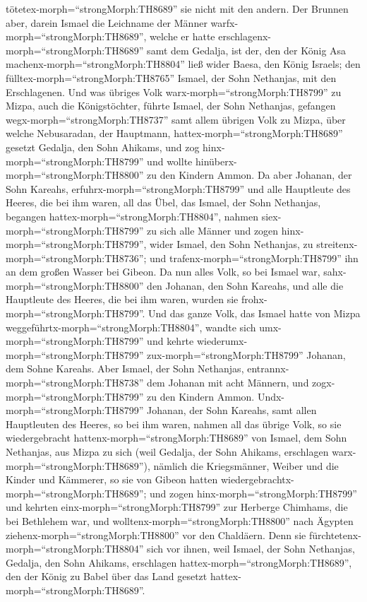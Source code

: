 tötetex-morph=``strongMorph:TH8689'' sie nicht mit den andern.
 Der Brunnen aber, darein Ismael die Leichname der Männer
warfx-morph=``strongMorph:TH8689'', welche er hatte
erschlagenx-morph=``strongMorph:TH8689'' samt dem Gedalja, ist der, den
der König Asa machenx-morph=``strongMorph:TH8804'' ließ wider Baesa, den
König Israels; den fülltex-morph=``strongMorph:TH8765'' Ismael, der Sohn
Nethanjas, mit den Erschlagenen.  Und was übriges Volk
warx-morph=``strongMorph:TH8799'' zu Mizpa, auch die Königstöchter,
führte Ismael, der Sohn Nethanjas, gefangen
wegx-morph=``strongMorph:TH8737'' samt allem übrigen Volk zu Mizpa, über
welche Nebusaradan, der Hauptmann, hattex-morph=``strongMorph:TH8689''
gesetzt Gedalja, den Sohn Ahikams, und zog
hinx-morph=``strongMorph:TH8799'' und wollte
hinüberx-morph=``strongMorph:TH8800'' zu den Kindern Ammon.
 Da aber Johanan, der Sohn Kareahs,
erfuhrx-morph=``strongMorph:TH8799'' und alle Hauptleute des Heeres, die
bei ihm waren, all das Übel, das Ismael, der Sohn Nethanjas, begangen
hattex-morph=``strongMorph:TH8804'',  nahmen
siex-morph=``strongMorph:TH8799'' zu sich alle Männer und zogen
hinx-morph=``strongMorph:TH8799'', wider Ismael, den Sohn Nethanjas, zu
streitenx-morph=``strongMorph:TH8736''; und
trafenx-morph=``strongMorph:TH8799'' ihn an dem großen Wasser bei
Gibeon.  Da nun alles Volk, so bei Ismael war,
sahx-morph=``strongMorph:TH8800'' den Johanan, den Sohn Kareahs, und
alle die Hauptleute des Heeres, die bei ihm waren, wurden sie
frohx-morph=``strongMorph:TH8799''.  Und das ganze Volk,
das Ismael hatte von Mizpa weggeführtx-morph=``strongMorph:TH8804'',
wandte sich umx-morph=``strongMorph:TH8799'' und kehrte
wiederumx-morph=``strongMorph:TH8799'' zux-morph=``strongMorph:TH8799''
Johanan, dem Sohne Kareahs.  Aber Ismael, der Sohn
Nethanjas, entrannx-morph=``strongMorph:TH8738'' dem Johanan mit acht
Männern, und zogx-morph=``strongMorph:TH8799'' zu den Kindern Ammon.
 Undx-morph=``strongMorph:TH8799'' Johanan, der Sohn
Kareahs, samt allen Hauptleuten des Heeres, so bei ihm waren, nahmen all
das übrige Volk, so sie wiedergebracht
hattenx-morph=``strongMorph:TH8689'' von Ismael, dem Sohn Nethanjas, aus
Mizpa zu sich (weil Gedalja, der Sohn Ahikams, erschlagen
warx-morph=``strongMorph:TH8689''), nämlich die Kriegsmänner, Weiber und
die Kinder und Kämmerer, so sie von Gibeon hatten
wiedergebrachtx-morph=``strongMorph:TH8689'';  und zogen
hinx-morph=``strongMorph:TH8799'' und kehrten
einx-morph=``strongMorph:TH8799'' zur Herberge Chimhams, die bei
Bethlehem war, und wolltenx-morph=``strongMorph:TH8800'' nach Ägypten
ziehenx-morph=``strongMorph:TH8800'' vor den Chaldäern. 
Denn sie fürchtetenx-morph=``strongMorph:TH8804'' sich vor ihnen, weil
Ismael, der Sohn Nethanjas, Gedalja, den Sohn Ahikams, erschlagen
hattex-morph=``strongMorph:TH8689'', den der König zu Babel über das
Land gesetzt hattex-morph=``strongMorph:TH8689''.

